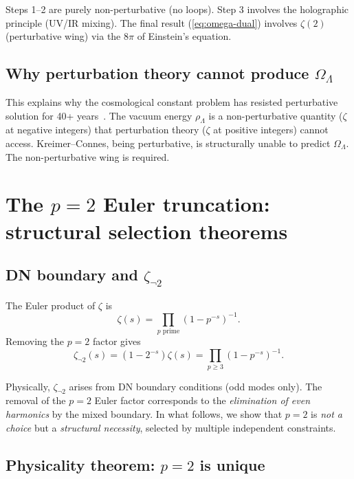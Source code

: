 \documentclass[11pt,a4paper]{article}
\begin{document}
Steps 1--2 are purely non-perturbative (no loops). Step 3 involves
the holographic principle (UV/IR mixing). The final result
(\ref{eq:omega-dual}) involves $\zeta(2)$ (perturbative wing) via
the $8\pi$ of Einstein's equation.

\subsection{Why perturbation theory cannot produce $\Omega_\Lambda$}

This explains why the cosmological constant problem has resisted
perturbative solution for 40+ years~\cite{Weinberg1989}. The
vacuum energy $\rho_\Lambda$ is a non-perturbative quantity
($\zeta$ at negative integers) that perturbation theory
($\zeta$ at positive integers) cannot access. Kreimer--Connes,
being perturbative, is structurally unable to predict
$\Omega_\Lambda$. The non-perturbative wing is required.

\section{The $p = 2$ Euler truncation: structural selection theorems}

\subsection{DN boundary and $\zeta_{\neg 2}$}

The Euler product of $\zeta$ is
\begin{equation}
\zeta(s) = \prod_{p\text{ prime}} (1 - p^{-s})^{-1}.
\end{equation}
Removing the $p = 2$ factor gives
\begin{equation}
\zeta_{\neg 2}(s) = (1 - 2^{-s})\zeta(s)
= \prod_{p \geq 3} (1 - p^{-s})^{-1}.
\end{equation}

Physically, $\zeta_{\neg 2}$ arises from DN boundary conditions
(odd modes only). The removal of the $p = 2$ Euler factor
corresponds to the \emph{elimination of even harmonics} by the
mixed boundary. In what follows, we show that $p = 2$ is
\emph{not a choice} but a \emph{structural necessity},
selected by multiple independent constraints.

\subsection{Physicality theorem: $p = 2$ is unique}
\end{document}
